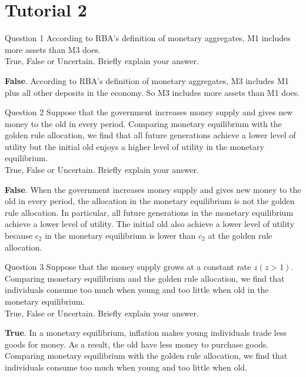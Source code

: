 \documentclass[a4paper]{article}
\newif\IfInSansMode
\numberwithin{equation}{section}
\numberwithin{figure}{section}
\begin{document}
\section{Tutorial 2}
	\begin{questionbox}{Question 1}
		According to RBA's definition of monetary aggregates, M1 includes more assets than M3 does.\\
		True, False or Uncertain. Briefly explain your answer.
		\begin{explanationbox}
			\textbf{False}. According to RBA's definition of monetary aggregates, M3 includes M1 plus all other deposits in the economy. So M3 includes more assets than M1 does.
		\end{explanationbox}
	\end{questionbox}
	\begin{questionbox}{Question 2}
		Suppose that the government increases money supply and gives new money to the old in every period. Comparing monetary equilibrium with the golden rule allocation, we find that all future generations achieve a lower level of utility but the initial old enjoys a higher level of utility in the monetary equilibrium.\\
		True, False or Uncertain. Briefly explain your answer.
		\begin{explanationbox}
			\textbf{False}. When the government increases money supply and gives new money to the old in every period, the allocation in the monetary equilibrium is not the golden rule allocation. In particular, all future generations in the monetary equilibrium achieve a lower level of utility. The initial old also achieve a lower level of utility because \( c_2 \) in the monetary equilibrium is lower than \( c_2 \) at the golden rule allocation.
		\end{explanationbox}
	\end{questionbox}
	\begin{questionbox}{Question 3}
		Suppose that the money supply grows at a constant rate \( z (z > 1) \). Comparing monetary equilibrium and the golden rule allocation, we find that individuals consume too much when young and too little when old in the monetary equilibrium.\\
		True, False or Uncertain. Briefly explain your answer.
		\begin{explanationbox}
			\textbf{True}. In a monetary equilibrium, inflation makes young individuals trade less goods for money. As a result, the old have less money to purchase goods. Comparing monetary equilibrium with the golden rule allocation, we find that individuals consume too much when young and too little when old.
		\end{explanationbox}
	\end{questionbox}
\end{document}
